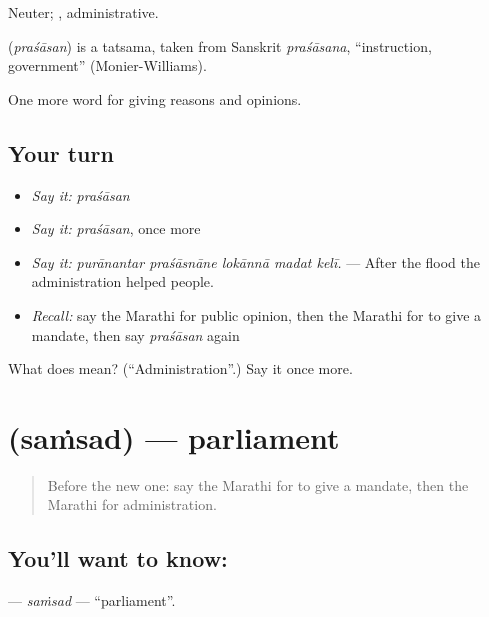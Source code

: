 Neuter; , administrative.

\begin{cousinweb}
\textbf{} (\emph{praśāsan}) is a tatsama, taken from Sanskrit \emph{praśāsana}, \textquotedblleft{}instruction, government\textquotedblright{} (Monier-Williams).
\end{cousinweb}

\begin{grammarlens}[title={What you've built}]
One more word for giving reasons and opinions.
\end{grammarlens}

\subsection*{Your turn}
\begin{itemize}
\raggedright
  \item \emph{Say it:} \emph{praśāsan}
  \item \emph{Say it:} \emph{praśāsan}, once more
  \item \emph{Say it:} \emph{purānantar praśāsnāne lokānnā madat kelī.} — After the flood the administration helped people.
  \item \emph{Recall:} say the Marathi for public opinion, then the Marathi for to give a mandate, then say \emph{praśāsan} again
\end{itemize}

\begin{tcolorbox}[breakable,colback=teal!4,colframe=teal!35!black,title={Before you move on}]
What does  mean? (\textquotedblleft{}Administration\textquotedblright{}.) Say it once more.
\end{tcolorbox}
\section[\texorpdfstring{\mr{संसद} (saṁsad)}{संसद (saṁsad)}]{ (saṁsad) — parliament}

\label{lesson:MR-C357-samsad}



\begin{quote}
Before the new one: say the Marathi for to give a mandate, then the Marathi for administration.
\end{quote}

\subsection*{You'll want to know: }
\textbf{} — \emph{saṁsad} — \textquotedblleft{}parliament\textquotedblright{}.

